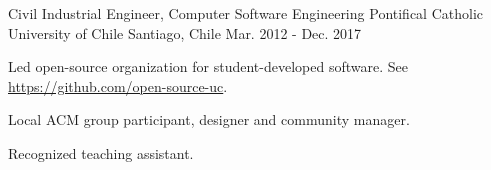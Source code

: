 

\begin{cventries}

  \cventry
    {Civil Industrial Engineer, Computer Software Engineering}
    {Pontifical Catholic University of Chile}
    {Santiago, Chile}
    {Mar. 2012 - Dec. 2017}
    {
      \begin{cvitems}
        \item Led open-source organization for student-developed software. See \url{https://github.com/open-source-uc}.
        \item {Local ACM group participant, designer and community manager.}
        \item {Recognized teaching assistant.}
      \end{cvitems}
    }

\end{cventries}
